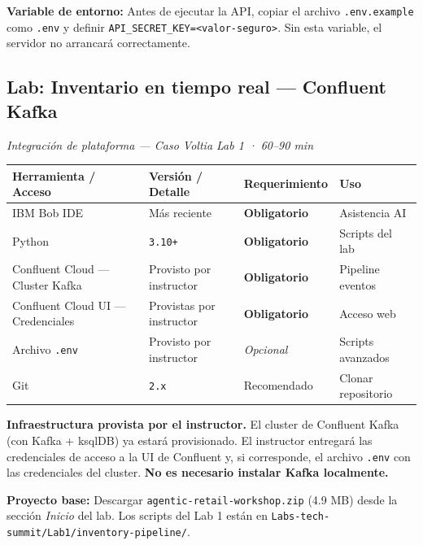 \documentclass[11pt, a4paper]{article}
\newcommand{\version}[1]{\texttt{\textcolor{ibmblue}{#1}}}
\newcommand{\cmd}[1]{\texttt{\textcolor{ibmdark}{\small #1}}}
\newcommand{\req}[1]{\textbf{\textcolor{ibmred}{#1}}}
\newcommand{\optional}[1]{\textit{\textcolor{ibmgray}{#1}}}
\begin{document}
\begin{warningbox}
  \textbf{Variable de entorno:} Antes de ejecutar la API, copiar el archivo \texttt{.env.example} como \texttt{.env} y definir \cmd{API\_SECRET\_KEY=<valor-seguro>}. Sin esta variable, el servidor no arrancará correctamente.
\end{warningbox}

\subsection{Lab: Inventario en tiempo real — Confluent Kafka}
\label{sec:confluent}

\textit{Integración de plataforma — Caso Voltia Lab 1 · 60--90 min}

\vspace{4pt}
\begin{tabular}{@{}llll@{}}
\toprule
\textbf{Herramienta / Acceso} & \textbf{Versión / Detalle} & \textbf{Requerimiento} & \textbf{Uso} \\
\midrule
IBM Bob IDE & Más reciente & \req{Obligatorio} & Asistencia AI \\
Python & \version{3.10+} & \req{Obligatorio} & Scripts del lab \\
Confluent Cloud — Cluster Kafka & Provisto por instructor & \req{Obligatorio} & Pipeline eventos \\
Confluent Cloud UI — Credenciales & Provistas por instructor & \req{Obligatorio} & Acceso web \\
Archivo \texttt{.env} & Provisto por instructor & \optional{Opcional} & Scripts avanzados \\
Git & \version{2.x} & Recomendado & Clonar repositorio \\
\bottomrule
\end{tabular}

\vspace{10pt}
\begin{criticalbox}
  \textbf{Infraestructura provista por el instructor.} El cluster de Confluent Kafka (con Kafka + ksqlDB) ya estará provisionado. El instructor entregará las credenciales de acceso a la UI de Confluent y, si corresponde, el archivo \texttt{.env} con las credenciales del cluster. \textbf{No es necesario instalar Kafka localmente.}
\end{criticalbox}

\begin{infobox}
  \textbf{Proyecto base:} Descargar \texttt{agentic-retail-workshop.zip} (4.9 MB) desde la sección \emph{Inicio} del lab. Los scripts del Lab 1 están en \texttt{Labs-tech-summit/Lab1/inventory-pipeline/}.
\end{infobox}
\end{document}
